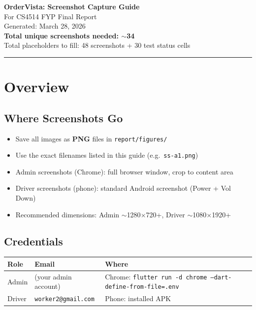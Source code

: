 \documentclass[11pt,a4paper]{article}
\begin{document}
\begin{center}
  {\LARGE\bfseries OrderVista: Screenshot Capture Guide}\\[6pt]
  {\large For CS4514 FYP Final Report}\\[12pt]
  {\normalsize Generated: March 28, 2026}\\[4pt]
  {\normalsize\textbf{Total unique screenshots needed: $\sim$34}}\\
  {\normalsize Total placeholders to fill: 48 screenshots + 30 test status cells}
\end{center}

\vspace{8pt}
\noindent\rule{\textwidth}{0.8pt}

\section{Overview}

\subsection{Where Screenshots Go}
\begin{itemize}[nosep]
  \item Save all images as \textbf{PNG} files in \texttt{report/figures/}
  \item Use the exact filenames listed in this guide (e.g.\ \texttt{ss-a1.png})
  \item Admin screenshots (Chrome): full browser window, crop to content area
  \item Driver screenshots (phone): standard Android screenshot (Power + Vol Down)
  \item Recommended dimensions: Admin $\sim$1280$\times$720+, Driver $\sim$1080$\times$1920+
\end{itemize}

\subsection{Credentials}
\begin{center}
\begin{tabular}{lll}
  \toprule
  \textbf{Role} & \textbf{Email} & \textbf{Where} \\
  \midrule
  Admin  & (your admin account)    & Chrome: \texttt{flutter run -d chrome --dart-define-from-file=.env} \\
  Driver & \texttt{worker2@gmail.com} & Phone: installed APK \\
  \bottomrule
\end{tabular}
\end{center}
\end{document}
